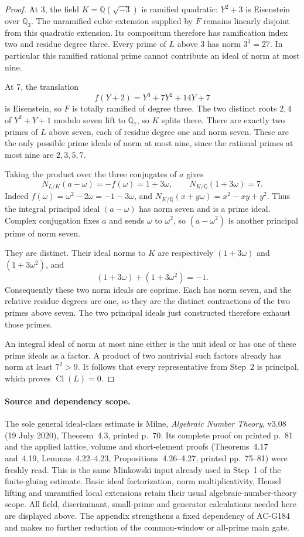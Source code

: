 \begin{proof}
At $3$, the field $K=\mathbb Q(\sqrt{-3})$ is ramified quadratic:
$Y^2+3$ is Eisenstein over $\mathbb Q_3$.  The unramified cubic
extension supplied by $F$ remains linearly disjoint from this
quadratic extension.  Its compositum therefore has ramification
index two and residue degree three.  Every prime of $L$ above
$3$ has norm $3^3=27$.  In particular this ramified rational prime
cannot contribute an ideal of norm at most nine.

At $7$, the translation
\[
                   f(Y+2)=Y^3+7Y^2+14Y+7
 \tag{G185.8}
\]
is Eisenstein, so $F$ is totally ramified of degree three.
The two distinct roots $2,4$ of $Y^2+Y+1$ modulo seven lift to
$\mathbb Q_7$, so $K$ splits there.  There are exactly two primes
of $L$ above seven, each of residue degree one and norm seven.
These are the only possible prime ideals of norm at most nine,
since the rational primes at most nine are $2,3,5,7$.

Taking the product over the three conjugates of $a$ gives
\[
 N_{L/K}(a-\omega)=-f(\omega)=1+3\omega,
 \qquad N_{K/\mathbb Q}(1+3\omega)=7.
 \tag{G185.9}
\]
Indeed $f(\omega)=\omega^2-2\omega=-1-3\omega$, and
$N_{K/\mathbb Q}(x+y\omega)=x^2-xy+y^2$.
Thus the integral principal ideal $(a-\omega)$ has norm seven
and is a prime ideal.  Complex conjugation fixes $a$ and sends
$\omega$ to $\omega^2$, so $(a-\omega^2)$ is another principal
prime of norm seven.

They are distinct.  Their ideal norms to $K$ are respectively
$(1+3\omega)$ and $(1+3\omega^2)$, and
\[
                  (1+3\omega)+(1+3\omega^2)=-1.
 \tag{G185.10}
\]
Consequently these two norm ideals are coprime.  Each has norm
seven, and the relative residue degrees are one, so they are the
distinct contractions of the two primes above seven.  The two
principal ideals just constructed therefore exhaust those primes.

An integral ideal of norm at most nine either is the unit ideal
or has one of these prime ideals as a factor.  A product of two
nontrivial such factors already has norm at least $7^2>9$.
It follows that every representative from Step~2 is principal,
which proves $\operatorname{Cl}(L)=0$.
\end{proof}

\paragraph{Source and dependency scope.}
The sole general ideal-class estimate is Milne,
\emph{Algebraic Number Theory}, v3.08 (19 July 2020),
Theorem~4.3, printed p.~70.  Its complete proof on printed
p.~81 and the applied lattice, volume and short-element proofs
(Theorems~4.17 and~4.19, Lemmas~4.22--4.23,
Propositions~4.26--4.27, printed pp.~75--81) were freshly read.
This is the same Minkowski input already used in Step~1 of
the finite-gluing estimate.  Basic ideal factorization, norm
multiplicativity, Hensel lifting and unramified local extensions
retain their usual algebraic-number-theory scope.  All field,
discriminant, small-prime and generator calculations needed here
are displayed above.  The appendix strengthens a fixed dependency
of AC-G184 and makes no further reduction of the common-window
or all-prime main gate.
